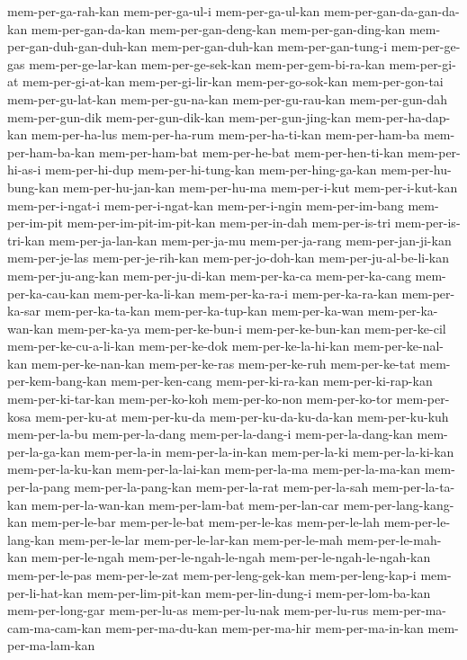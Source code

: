 {mem-per-ga-rah-kan mem-per-ga-ul-i mem-per-ga-ul-kan
mem-per-gan-da-gan-da-kan mem-per-gan-da-kan mem-per-gan-deng-kan
mem-per-gan-ding-kan mem-per-gan-duh-gan-duh-kan mem-per-gan-duh-kan
mem-per-gan-tung-i mem-per-ge-gas mem-per-ge-lar-kan mem-per-ge-sek-kan
mem-per-gem-bi-ra-kan mem-per-gi-at mem-per-gi-at-kan mem-per-gi-lir-kan
mem-per-go-sok-kan mem-per-gon-tai mem-per-gu-lat-kan mem-per-gu-na-kan
mem-per-gu-rau-kan mem-per-gun-dah mem-per-gun-dik mem-per-gun-dik-kan
mem-per-gun-jing-kan mem-per-ha-dap-kan mem-per-ha-lus mem-per-ha-rum
mem-per-ha-ti-kan mem-per-ham-ba mem-per-ham-ba-kan mem-per-ham-bat
mem-per-he-bat mem-per-hen-ti-kan mem-per-hi-as-i mem-per-hi-dup
mem-per-hi-tung-kan mem-per-hing-ga-kan mem-per-hu-bung-kan
mem-per-hu-jan-kan mem-per-hu-ma mem-per-i-kut mem-per-i-kut-kan
mem-per-i-ngat-i mem-per-i-ngat-kan mem-per-i-ngin mem-per-im-bang
mem-per-im-pit mem-per-im-pit-im-pit-kan mem-per-in-dah mem-per-is-tri
mem-per-is-tri-kan mem-per-ja-lan-kan mem-per-ja-mu mem-per-ja-rang
mem-per-jan-ji-kan mem-per-je-las mem-per-je-rih-kan mem-per-jo-doh-kan
mem-per-ju-al-be-li-kan mem-per-ju-ang-kan mem-per-ju-di-kan mem-per-ka-ca
mem-per-ka-cang mem-per-ka-cau-kan mem-per-ka-li-kan mem-per-ka-ra-i
mem-per-ka-ra-kan mem-per-ka-sar mem-per-ka-ta-kan mem-per-ka-tup-kan
mem-per-ka-wan mem-per-ka-wan-kan mem-per-ka-ya mem-per-ke-bun-i
mem-per-ke-bun-kan mem-per-ke-cil mem-per-ke-cu-a-li-kan mem-per-ke-dok
mem-per-ke-la-hi-kan mem-per-ke-nal-kan mem-per-ke-nan-kan mem-per-ke-ras
mem-per-ke-ruh mem-per-ke-tat mem-per-kem-bang-kan mem-per-ken-cang
mem-per-ki-ra-kan mem-per-ki-rap-kan mem-per-ki-tar-kan mem-per-ko-koh
mem-per-ko-non mem-per-ko-tor mem-per-kosa mem-per-ku-at mem-per-ku-da
mem-per-ku-da-ku-da-kan mem-per-ku-kuh mem-per-la-bu mem-per-la-dang
mem-per-la-dang-i mem-per-la-dang-kan mem-per-la-ga-kan mem-per-la-in
mem-per-la-in-kan mem-per-la-ki mem-per-la-ki-kan mem-per-la-ku-kan
mem-per-la-lai-kan mem-per-la-ma mem-per-la-ma-kan mem-per-la-pang
mem-per-la-pang-kan mem-per-la-rat mem-per-la-sah mem-per-la-ta-kan
mem-per-la-wan-kan mem-per-lam-bat mem-per-lan-car mem-per-lang-kang-kan
mem-per-le-bar mem-per-le-bat mem-per-le-kas mem-per-le-lah
mem-per-le-lang-kan mem-per-le-lar mem-per-le-lar-kan mem-per-le-mah
mem-per-le-mah-kan mem-per-le-ngah mem-per-le-ngah-le-ngah
mem-per-le-ngah-le-ngah-kan mem-per-le-pas mem-per-le-zat
mem-per-leng-gek-kan mem-per-leng-kap-i mem-per-li-hat-kan
mem-per-lim-pit-kan mem-per-lin-dung-i mem-per-lom-ba-kan mem-per-long-gar
mem-per-lu-as mem-per-lu-nak mem-per-lu-rus mem-per-ma-cam-ma-cam-kan
mem-per-ma-du-kan mem-per-ma-hir mem-per-ma-in-kan mem-per-ma-lam-kan
}
